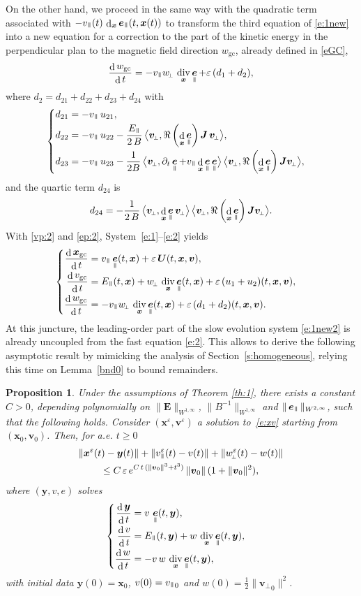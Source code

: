 \documentclass[10pt]{amsart}
\newenvironment{splitcases}
{\begin{cases}\begin{aligned}}
{\end{aligned}\end{cases}}
\newcommand{\sperp}{{\scriptscriptstyle\perp}}
\newcommand{\blangle}{\bigl\langle}
\newcommand{\brangle}{\bigr\rangle}
\let\eps\varepsilon
\let\d\partial
\DeclareMathOperator\dD{d}\let\dd\dD
\DeclareMathOperator{\Div}{div}
\theoremstyle{plain}
\newtheorem{proposition}[theorem]{Proposition}
\theoremstyle{definition}
\newcommand{\be}{\begin{equation}}
\newcommand{\ee}{\end{equation}}
\newcommand{\bpr}{\begin{proposition}}
\newcommand{\epr}{\end{proposition}}
\newcommand\bE{{\boldsymbol E}}
\newcommand\bJ{{\boldsymbol J}}
\newcommand\bU{{\boldsymbol U}}
\newcommand\bfv{{\boldsymbol v}}
\newcommand\bfx{{\boldsymbol x}}
\newcommand\bfy{{\boldsymbol y}}
\DeclareMathOperator{\beD}{\boldsymbol{e}}
\newcommand\eDpar{\beD_\mypar}
\newcommand\vpar{v_\mypar}
\newcommand\bvperp{\bfv_{\!\sperp}}
\newcommand\eperp{w_{\!\sperp}}
\let\e w
\newcommand\Epar{E_\mypar}
\newcommand{\GC}{\bfx_\mathrm{gc}}
\newcommand{\eGC}{w_\mathrm{gc}}
\newcommand{\vGC}{v_\mathrm{gc}}
\newcommand{\mypar}{{\mkern3mu\vphantom{\perp}\vrule depth 0pt\mkern2mu\vrule depth 0pt\mkern3mu}}
\begin{document}
On the other hand, we proceed in the same way with the quadratic term associated with
$-\vpar(t)\,\dD_{\bfx}\eDpar(t,\bfx(t))$ to transform the third
equation of \eqref{e:1new} into a new equation for a correction to the part of the kinetic energy in the perpendicular plan to the magnetic field direction $\eGC$, already defined in \eqref{eGC},
\be
\label{ep:2}
\frac{\dD\eGC }{\dD t} =-\vpar \eperp\, \Div_\bfx\eDpar+\eps \,(d_1+d_2),
\ee
where $d_2=d_{21}+d_{22}+d_{23}+d_{24}$ with
\[
\begin{splitcases}
 d_{21}&= -\vpar\,u_{21},
\\
 d_{22}&= -\vpar\,u_{22}
-
\frac{\Epar}{2\,B} \, \blangle \bvperp,\Re\left(\dD_\bfx \eDpar\right)\bJ\,\bvperp\brangle,
\\
 d_{23}&=-\vpar\,u_{23}- \frac{1}{2B}\,\blangle \bvperp ,
\d_t\eDpar+\vpar\dD_{\bfx}\eDpar\eDpar \brangle\,\blangle \bvperp,
\Re\left(\dD_\bfx \eDpar\right)\bJ\bvperp\brangle,
\end{splitcases}
\]
and the quartic term $d_{24}$ is
\[
 d_{24}= -\frac{1}{2\,B}\, \blangle \bvperp ,
\dD_{\bfx}\eDpar\bvperp \brangle\, \blangle \bvperp,
{\Re\left(\dD_\bfx \eDpar\right)\bJ}\bvperp\brangle.
\]
With \eqref{vp:2} and \eqref{ep:2}, System~\eqref{e:1}--\eqref{e:2} yields
\be
\label{e:1new2}
\begin{splitcases}

\frac{\dD\GC}{\dD t}&=\vpar\eDpar(t,\bfx) +\eps \,\bU(t,\bfx,\bfv),
\\
\frac{\dD \vGC}{\dD t}&=\Epar(t,\bfx)+\eperp\, \Div_\bfx\eDpar(t,\bfx)
+\eps\,(u_1 +u_2)(t,\bfx,\bfv),
\\
 \frac{\dD \eGC}{\dD t}&=
-\vpar \eperp\, \Div_\bfx\eDpar(t,\bfx) +\eps \,(d_1+d_2) (t,\bfx,\bfv).
\end{splitcases}
\ee
At this juncture, the leading-order part of the slow evolution system \eqref{e:1new2} is already uncoupled from the fast equation \eqref{e:2}. This allows to derive the following asymptotic result by mimicking the analysis of Section~\ref{s:homogeneous}, relying this time on Lemma~\ref{bnd0} to bound remainders.

\bpr
\label{1st-xve}
Under the assumptions of Theorem \ref{th:1}, there exists a constant $C>0$, depending
polynomially on $\|\bE\|_{W^{1,\infty}}$, $\|B^{-1}\|_{W^{1,\infty}}$ and $\|\eDpar\|_{W^{2,\infty}}$, such that the following holds. Consider $(\bfx^\eps,\bfv^\eps)$ a solution to~\eqref{e:xv} starting from $(\bfx_0,\bfv_0)$. Then, for a.e. $t\geq0 $
\begin{multline*}
\|\bfx^\eps(t)-\bfy(t)\|
+\|\vpar^\eps(t)-v(t)\|
+\|\eperp^\eps(t)-\e(t)\|\\
\leq C\,\eps\,e^{C\,t\,(\|\bfv_0\|^3+t^3)}
\,\|\bfv_0\|\,(1+\|\bfv_0\|^2),
\end{multline*}
where $(\bfy,v,e)$ solves
\[
\begin{splitcases}
\frac{\dD\bfy}{\dD t} &=v\,\eDpar(t,\bfy),\\
\frac{\dD v}{\dD t}&=\Epar(t,\bfy)+\e\, \Div_\bfx\eDpar(t,\bfy),\\
\frac{\dD \e}{\dD t}&=
-v\,\e\, \Div_\bfx\eDpar(t,\bfy),
\end{splitcases}
\]
with initial data $\bfy(0)=\bfx_0$, $v(0)={\vpar}_{0}$ and $\e(0)=\tfrac12\|{\bvperp}_0\|^2$.
\epr
\end{document}
